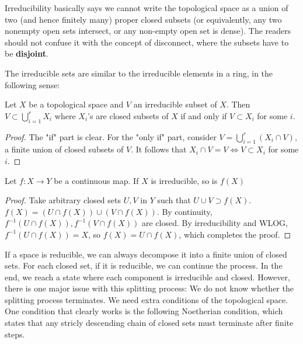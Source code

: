 \documentclass{note-eng}
\begin{document}
Irreducibility basically says we cannot write the topological space as a union of two (and hence finitely many) proper closed subsets (or equivalently, any two nonempty open sets intersect, or any non-empty open set is dense). The readers should not confuse it with the concept of disconnect, where the subsets have to be \textbf{disjoint}.

The irreducible sets are similar to the irreducible elements in a ring, in the following sense:

\begin{proposition}\label{prop:irreducible-avoidance}
    Let $X$ be a topological space and $V$ an irreducible subset of $X$. Then $V \subset \bigcup\limits_{i = 1}^{r} X_i$ where $X_i$'s are closed subsets of $X$ if and only if $V \subset X_i$ for some $i$.
\end{proposition}

\begin{proof}
    The "if" part is clear. For the "only if" part, consider $V = \bigcup\limits_{i = 1}^{r} (X_i \cap V)$, a finite union of closed subsets of $V$. It follows that $X_i \cap V = V \Leftrightarrow V \subset X_i$ for some $i$.
\end{proof}

\begin{proposition}\label{prop:cont-image-irred}
    Let $f: X \rightarrow Y$ be a continuous map. If $X$ is irreducible, so is $f(X)$
\end{proposition}

\begin{proof}
    Take arbitrary closed sets $U, V$ in $Y$ such that $U \cup V \supset f(X)$. $f(X) = (U \cap f(X)) \cup (V \cap f(X))$. By continuity, $f ^{-1} (U \cap f(X)), f ^{-1} (V \cap f(X))$ are closed. By irreducibility and WLOG, $f ^{-1}(U \cap f(X)) = X$, so $f(X) = U \cap f(X)$, which completes the proof.
\end{proof}

If a space is reducible, we can always decompose it into a finite union of closed sets. For each closed set, if it is reducible, we can continue the process. In the end, we reach a state where each component is irreducible and closed. However, there is one major issue with this splitting process: We do not know whether the splitting process terminates. We need extra conditions of the topological space. One condition that clearly works is the following Noetherian condition, which states that any stricly descending chain of closed sets must terminate after finite steps.
\end{document}
